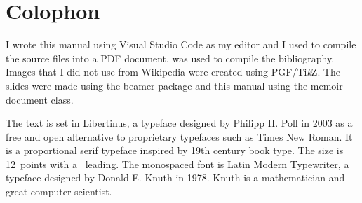 \chapter{Colophon}
I wrote this manual using Visual Studio Code as my editor and I used  to compile the source files into a \acs{PDF} document.
 was used to compile the bibliography.
Images that I did not use from Wikipedia were created using \acs{PGF}/Ti\emph{k}Z.
The slides were made using the beamer package and this manual using the memoir document class.

The text is set in Libertinus, a typeface designed by Philipp H. Poll in 2003 as a free and open alternative to proprietary typefaces such as Times New Roman.
It is a proportional serif typeface inspired by 19th century book type.
The size is 12~points with a \the\baselineskip\ leading.
The monospaced font is Latin Modern Typewriter, a typeface designed by Donald E. Knuth in 1978.
Knuth is a mathematician and great computer scientist.